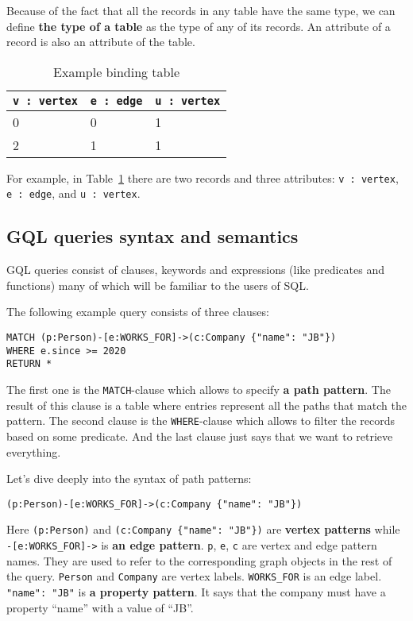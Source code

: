 \documentclass[14pt]{constructor-thesis}
\theoremstyle{definition}
\begin{document}
Because of the fact that all the records in any table have the same type, we can define \textbf{the type of a table} as the type of any of its records. An attribute of a record is also an attribute of the table.

\begin{table}
  \centering
  
  \begin{tabular}{ |p{3cm}|p{3cm}|p{3cm}|  }
    \hline
    \texttt{v : vertex} & \texttt{e : edge} & \texttt{u : vertex} \\
    \hline
    0 & 0 & 1 \\
    2 & 1 & 1 \\
    \hline
  \end{tabular}

  \caption{Example binding table}
  \label{tab:example-binding-table}
\end{table}

For example, in Table~\ref{tab:example-binding-table} there are two records and three attributes: \texttt{v : vertex}, \texttt{e : edge}, and \texttt{u : vertex}. 


\subsection{GQL queries syntax and semantics}
\label{section:intro-GQL}

GQL queries consist of clauses, keywords and expressions (like predicates and functions) many of which will be familiar to the users of SQL.


The following example query consists of three clauses:
\begin{verbatim}
MATCH (p:Person)-[e:WORKS_FOR]->(c:Company {"name": "JB"})
WHERE e.since >= 2020
RETURN *
\end{verbatim}

The first one is the \texttt{MATCH}-clause which allows to specify \textbf{a path pattern}. The result of this clause is a table where entries represent all the paths that match the pattern. The second clause is the \texttt{WHERE}-clause which allows to filter the records based on some predicate. And the last clause just says that we want to retrieve everything.

Let's dive deeply into the syntax of path patterns:
\begin{verbatim}
(p:Person)-[e:WORKS_FOR]->(c:Company {"name": "JB"})
\end{verbatim}

Here \verb+(p:Person)+ and \verb+(c:Company {"name": "JB"})+ are \textbf{vertex patterns} while \verb+-[e:WORKS_FOR]->+ is \textbf{an edge pattern}. \texttt{p}, \texttt{e}, \texttt{c} are vertex and edge pattern names. They are used to refer to the corresponding graph objects in the rest of the query. \texttt{Person} and \texttt{Company} are vertex labels. \texttt{WORKS\_FOR} is an edge label. \texttt{"name": "JB"} is \textbf{a property pattern}. It says that the company must have a property ``name'' with a value of ``JB''.
\end{document}
